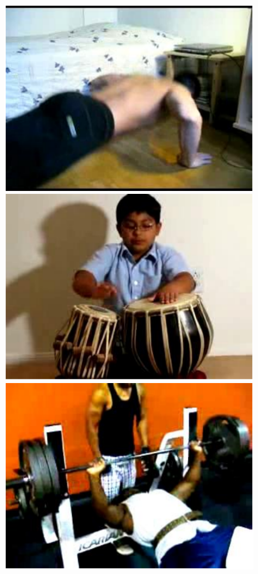 \documentclass[10pt,twocolumn,letterpaper]{article}
\begin{document}
\begin{figure}[!t]
\begin{center}
\includegraphics[scale=0.305]{figures/dataset_thumb/ucf/crop_class3.pdf} 
\includegraphics[scale=0.305]{figures/dataset_thumb/ucf/crop_class4.pdf} 
\includegraphics[scale=0.305]{figures/dataset_thumb/ucf/crop_class5.pdf} 

\end{center}
\end{figure}
\end{document}
